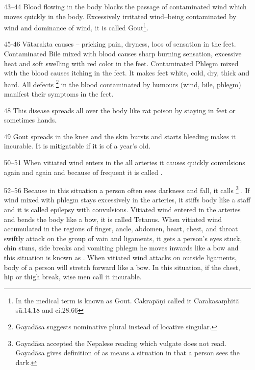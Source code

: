 \begin{translation}
{\item[43--44] Blood flowing in the body blocks the passage of contaminated wind which moves quickly in the body. Excessively irritated wind--being contaminated by wind and dominance of wind, it is called  Gout\footnote{In the medical term  is known as Gout. Cakrapāṇi called it  Carakasaṃhitā sū.14.18 and ci.28.66}.

\item[45-46] Vātarakta causes -- pricking pain, dryness, loos of sensation in the feet. Contaminated Bile mixed with blood causes sharp burning sensation, excessive heat and soft swelling with red color in the feet. Contaminated Phlegm mixed with the blood causes itching in the feet. It makes feet white, cold, dry, thick and hard. All defects \footnote{Gayadāsa suggests  nominative plural instead of locative singular.} in the blood contaminated by humours (wind, bile, phlegm) manifest their symptoms in the feet.

\item[48] This disease spreads all over the body like rat poison by staying in feet or sometimes hands.

\item[49] Gout spreads in the knee and the skin bursts and starts bleeding makes it incurable. It is mitigatable if it is of a year’s old.

\item[50--51] When vitiated wind enters in the all arteries it causes
quickly convulsions again and again and because of frequent
 it is called .

\item[52--56] Because in this situation a person often sees darkness and
fall, it calls  \footnote{Gayadāsa
    accepted the Nepalese reading  which vulgate does not read.
    Gayadāsa gives definition of  as  means a
    situation in that a person sees the dark.} . If wind mixed with phlegm
    stays excessively in the arteries, it stiffs body like a staff and it is
    called  epilepsy with convulsions. Vitiated wind entered
    in the arteries and bends the body like a bow, it is called
     Tetanus. When vitiated wind accumulated in the regions
    of finger, ancle, abdomen, heart, chest, and throat swiftly attack on the
    group of vain and ligaments, it gets a person’s eyes stuck, chin stuns,
    side breaks and vomiting phlegm he moves inwards like a bow and this
    situation is known as . When vitiated wind
    attacks on outside ligaments, body of a person will stretch forward like
    a bow. In this situation, if the chest, hip or thigh break, wise men call
    it incurable.

}
\end{translation}

